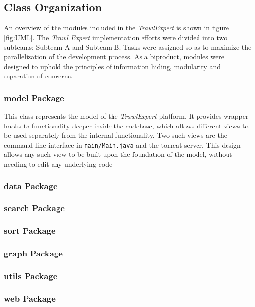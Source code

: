 \documentclass{article}
\begin{document}
\subsection{Class Organization}
An overview of the modules included in the \textit{TrawlExpert} is shown in figure \ref{fig:UML}. The \textit{Trawl Expert} implementation efforts were divided into two subteams: Subteam A and Subteam B. Tasks were assigned so as to maximize the parallelization of the development process. As a biproduct, modules were designed to uphold the principles of information hiding, modularity and separation of concerns.

\subsubsection{model Package}
This class represents the model of the \textit{TrawlExpert} platform. It provides wrapper hooks to functionality deeper inside the codebase, which allows different views to be used separately from the internal functionality. Two such views are the command-line interface in \texttt{main/Main.java} and the tomcat server. This design allows any such view to be built upon the foundation of the model, without needing to edit any underlying code.

\subsubsection{data Package}

\subsubsection{search Package}

\subsubsection{sort Package}

\subsubsection{graph Package}

\subsubsection{utils Package}

\subsubsection{web Package}
\end{document}
